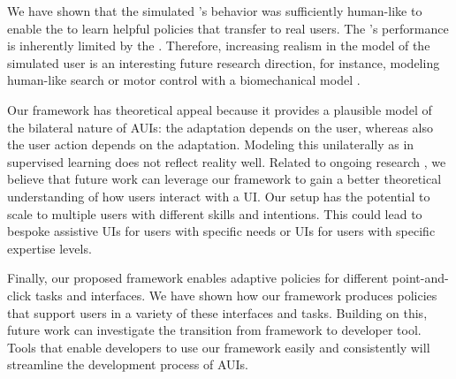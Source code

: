 We have shown that the simulated \useragent's behavior was sufficiently human-like to enable the \interfaceagent to learn helpful policies that transfer to real users. The \interfaceagent's performance is inherently limited by the \useragent. Therefore, increasing realism in the model of the simulated user is an interesting future research direction, for instance, modeling human-like search \cite{chen2015emergence} or motor control with a biomechanical model \cite{fischer2021reinforcement}. 

Our framework has theoretical appeal because it provides a plausible model of the bilateral nature of AUIs: the adaptation depends on the user, whereas also the user action depends on the adaptation. Modeling this unilaterally as in supervised learning does not reflect reality well. Related to ongoing research \cite{murray2022simulation}, we believe that future work can leverage our framework to gain a better theoretical understanding of how users interact with a UI.  Our setup has the potential to scale to multiple users with different skills and intentions. This could lead to bespoke assistive UIs for users with specific needs or UIs for users with specific expertise levels. 

Finally, our proposed framework enables adaptive policies for different point-and-click tasks and interfaces. We have shown how our framework produces policies that support users in a variety of these interfaces and tasks. Building on this, future work can investigate the transition from framework to developer tool. Tools that enable developers to use our framework easily and consistently will streamline the development process of AUIs.
